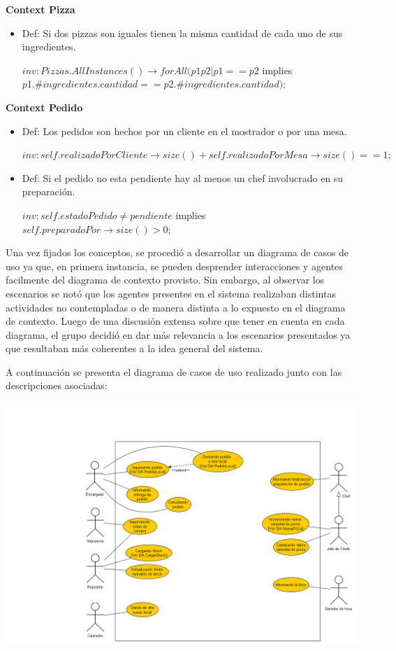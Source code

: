 \documentclass[a4paper,11pt] {article}
\begin{document}
\textbf{Context Pizza}

\begin{itemize}
	\item Def: Si dos pizzas son iguales tienen la misma cantidad de cada uno de sus ingredientes.
	
	$inv: Pizzas.AllInstances()\rightarrow forAll(p1 p2 | p1 == p2 $ implies $ p1.\#ingredientes.cantidad == p2.\#ingredientes.cantidad);$
\end{itemize}

\textbf{Context Pedido}

\begin{itemize}
	\item Def: Los pedidos son hechos por un cliente en el mostrador o por una mesa.
	
	$inv: self.realizadoPorCliente\rightarrow size() + self.realizadoPorMesa\rightarrow size() == 1;$
	
	\item Def: Si el pedido no esta pendiente hay al menos un chef involucrado en su preparaci\'on.
	
	$inv: self.estadoPedido \neq pendiente$ implies $self.preparadoPor\rightarrow size() > 0;$
\end{itemize}


\bigskip

Una vez fijados los conceptos, se procedi\'o a desarrollar un diagrama de casos de uso ya que, en primera instancia, se pueden desprender interacciones y agentes facilmente del diagrama de contexto provisto. Sin embargo, al observar los escenarios se not\'o que los agentes presentes en el sistema realizaban distintas actividades no contempladas o de manera distinta a lo expuesto en el diagrama de contexto. Luego de una discusi\'on extensa sobre que tener en cuenta en cada diagrama, el grupo decidi\'o en dar m\'as relevancia a los escenarios presentados ya que resultaban m\'as coherentes a la idea general del sistema.

A continuaci\'on se presenta el diagrama de casos de uso realizado junto con las descripciones asociadas:

\begin{center}
 \includegraphics[width=1\textwidth]{Diagramas/CasosDeUso.png}
\end{center}
\end{document}
